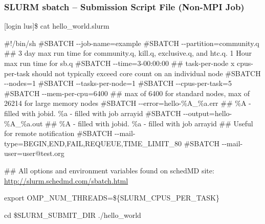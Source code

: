 \documentclass[t,hyperref={pdfpagelabels=false}]{beamer}
\newcommand{\ddash}{-{}-}
\begin{document}
\begin{frame}[fragile]
\frametitle{SLURM sbatch -- Submission Script File (Non-MPI Job)}
\begin{semiverbatim}\tiny
[login lus]\$ cat hello_world.slurm

\#!/bin/sh
\#SBATCH \ddash{}job-name=example
\#SBATCH \ddash{}partition=community.q
\#\# 3 day max run time for community.q, kill.q, exclusive.q, and htc.q.  1 Hour max run time for sb.q
\#SBATCH \ddash{}time=3-00:00:00
\#\# task-per-node x cpus-per-task should not typically exceed core count on an individual node 
\#SBATCH \ddash{}nodes=1
\#SBATCH \ddash{}tasks-per-node=1
\#SBATCH \ddash{}cpus-per-task=5
\#SBATCH \ddash{}mem-per-cpu=6400 \#\# max of 6400 for standard nodes, max of 26214 for large memory nodes                                                                                                                                              
\#SBATCH \ddash{}error=hello-\%A\_\%a.err \#\# \%A - filled with jobid. \%a - filled with job arrayid
\#SBATCH \ddash{}output=hello-\%A\_\%a.out \#\# \%A - filled with jobid. \%a - filled with job arrayid
\#\# Useful for remote notification
\#SBATCH \ddash{}mail-type=BEGIN,END,FAIL,REQUEUE,TIME\_LIMIT\_80
\#SBATCH \ddash{}mail-user=user@test.org

\#\# All options and environment variables found on schedMD site: \href{http://slurm.schedmd.com/sbatch.html}{http://slurm.schedmd.com/sbatch.html}

export OMP\_NUM\_THREADS=\$\{SLURM\_CPUS\_PER\_TASK\}

cd \$SLURM\_SUBMIT\_DIR
./hello\_world
\end{semiverbatim}
\end{frame}
\end{document}
